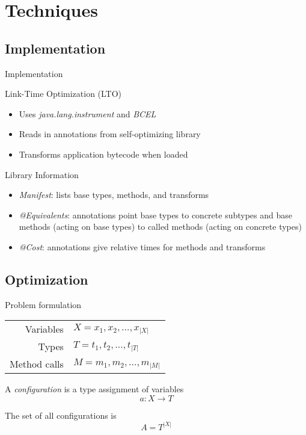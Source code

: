 \documentclass{beamer}
\begin{document}
\section{Techniques}

\subsection{Implementation}

\begin{frame}{Implementation}
  \begin{block}{Link-Time Optimization (LTO)}
    \begin{itemize}
    \item Uses {\it java.lang.instrument} and {\it BCEL}
    \item Reads in annotations from self-optimizing library
    \item Transforms application bytecode when loaded
    \end{itemize}
  \end{block}
\pause
  \begin{block}{Library Information}
    \begin{itemize}
    \item {\it Manifest}: lists base types, methods, and transforms
    \item {\it @Equivalents}: annotations point base types to concrete subtypes and base methods (acting on base types) to called methods (acting on concrete types)
    \item {\it @Cost}: annotations give relative times for methods and transforms
    \end{itemize}
  \end{block}
\end{frame}

\subsection{Optimization}

\begin{frame}{Problem formulation}
  \begin{tabular}{rl}
  Variables &$X = x_1, x_2, \dotsc, x_{|X|}$ \\
  Types &$T = t_1, t_2, \dotsc, t_{|T|}$ \\
  Method calls &$M = m_1, m_2, \dotsc, m_{|M|}$
  \end{tabular}
  \vspace{0.5cm}

  A {\em configuration} is a type assignment of variables \[a : X \rightarrow T\]

  The set of all configurations is \[A = T^{|X|}\]
\end{frame}
\end{document}
